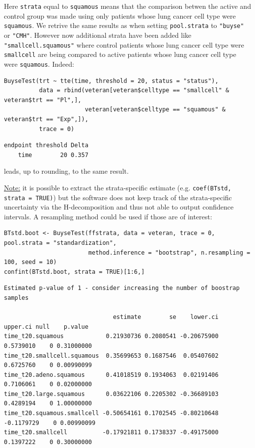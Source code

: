 \documentclass[12pt]{article}
\begin{document}
Here \texttt{strata} equal to \texttt{squamous} means that the comparison betwen the
active and control group was made using only patients whose lung
cancer cell type were \texttt{squamous}. We retrive the same results as when
setting \texttt{pool.strata} to \texttt{"buyse"} or \texttt{"CMH"}. However now additional
strata have been added like \texttt{"smallcell.squamous"} where control
patients whose lung cancer cell type were \texttt{smallcell} are being
compared to active patients whose lung cancer cell type were
\texttt{squamous}. Indeed:
\lstset{language=r,label= ,caption= ,captionpos=b,numbers=none}
\begin{lstlisting}
BuyseTest(trt ~ tte(time, threshold = 20, status = "status"),
          data = rbind(veteran[veteran$celltype == "smallcell" & veteran$trt == "Pl",],
                       veteran[veteran$celltype == "squamous" & veteran$trt == "Exp",]),
          trace = 0)
\end{lstlisting}

\begin{verbatim}
endpoint threshold Delta
    time        20 0.357
\end{verbatim}


leads, up to rounding, to the same result.

\clearpage

\uline{Note:} it is possible to extract the strata-specific estimate
(e.g. \texttt{coef(BTstd, strata = TRUE)}) but the software does not keep
track of the strata-specific uncertainty via the H-decomposition and
thus not able to output confidence intervals. A resampling method
could be used if those are of interest: \newline

\lstset{language=r,label= ,caption= ,captionpos=b,numbers=none}
\begin{lstlisting}
BTstd.boot <- BuyseTest(ffstrata, data = veteran, trace = 0, pool.strata = "standardization",
                        method.inference = "bootstrap", n.resampling = 100, seed = 10)
confint(BTstd.boot, strata = TRUE)[1:6,]
\end{lstlisting}

\begin{verbatim}
Estimated p-value of 1 - consider increasing the number of boostrap samples 

                               estimate        se    lower.ci   upper.ci null    p.value
time_t20.squamous            0.21930736 0.2080541 -0.20675900  0.5739010    0 0.31000000
time_t20.smallcell.squamous  0.35699653 0.1687546  0.05407602  0.6725760    0 0.00990099
time_t20.adeno.squamous      0.41018519 0.1934063  0.02191406  0.7106061    0 0.02000000
time_t20.large.squamous      0.03622106 0.2205302 -0.36689103  0.4289194    0 1.00000000
time_t20.squamous.smallcell -0.50654161 0.1702545 -0.80210648 -0.1179729    0 0.00990099
time_t20.smallcell          -0.17921811 0.1738337 -0.49175000  0.1397222    0 0.30000000
\end{verbatim}
\end{document}

